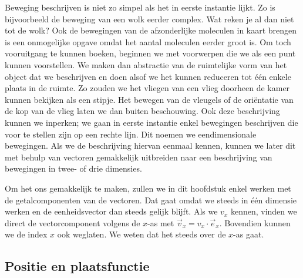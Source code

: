 \documentclass{ximera}
\begin{document}
	\author{Bart Lambregs}
    \xmsource


	Beweging beschrijven is niet zo simpel als het in eerste instantie lijkt. Zo is bijvoorbeeld de beweging van een wolk eerder complex. Wat reken je al dan niet tot de wolk? Ook de bewegingen van de afzonderlijke moleculen in kaart brengen is een onmogelijke opgave omdat het aantal moleculen eerder groot is. Om toch vooruitgang te kunnen boeken, beginnen we met voorwerpen die we als een punt kunnen voorstellen. We maken dan abstractie van de ruimtelijke vorm van het object dat we beschrijven en doen alsof we het kunnen reduceren tot \'e\'en enkele plaats in de ruimte. Zo zouden we het vliegen van een vlieg doorheen de kamer kunnen bekijken als een stipje. Het bewegen van de vleugels of de ori\"entatie van de kop van de vlieg laten we dan buiten beschouwing. Ook deze beschrijving kunnen we inperken; we gaan in eerste instantie enkel bewegingen beschrijven die voor te stellen zijn op een rechte lijn. Dit noemen we eendimensionale bewegingen. Als we de beschrijving hiervan eenmaal kennen, kunnen we later dit met behulp van vectoren gemakkelijk uitbreiden naar een beschrijving van bewegingen in twee- of drie dimensies.
	
	Om het ons gemakkelijk te maken, zullen we in dit hoofdstuk enkel werken met de getalcomponenten van de vectoren. Dat gaat omdat we steeds in \'e\'en dimensie werken en de eenheidsvector dan steeds gelijk blijft. Als we $v_x$ kennen, vinden we direct de vectorcomponent volgens de $x$-as met $\vec{v}_x=v_x\cdot\vec{e}_x$. Bovendien kunnen we de index $x$ ook weglaten. We weten dat het steeds over de $x$-as gaat.
	
	

	
	\subsection{Positie en plaatsfunctie}
	
\end{document}
